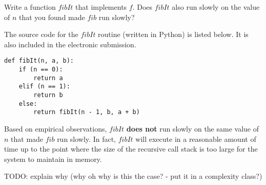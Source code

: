 \documentclass[11pt]{article}
\begin{document}
\begin{prob}{5}
Write a function $fibIt$ that implements $f$. Does $fibIt$ also run slowly on the value of $n$ that you found made $fib$ run slowly?
\end{prob}
\begin{sol} 
The source code for the $fibIt$ routine (written in Python) is listed below. It is also included in the electronic submission.

\begin{lstlisting}
def fibIt(n, a, b):
	if (n == 0):
		return a
	elif (n == 1):
		return b
	else:
		return fibIt(n - 1, b, a + b)
\end{lstlisting}
\end{sol}

Based on empirical observations, $fibIt$ \textbf{does not} run slowly on the same value of $n$ that made $fib$ run slowly. In fact, $fibIt$ will execute in a reasonable amount of time up to the point where the size of the recursive call stack is too large for the system to maintain in memory. 

TODO: explain why (why oh why is this the case? - put it in a complexity class?)
\end{document}

